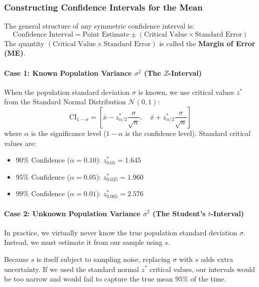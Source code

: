 \subsubsection{Constructing Confidence Intervals for the Mean}
The general structure of any symmetric confidence interval is:
\begin{equation}
\text{Confidence Interval} = \text{Point Estimate} \pm (\text{Critical Value} \times \text{Standard Error})\label{eq:ci_general_structure}
\end{equation}
The quantity $(\text{Critical Value} \times \text{Standard Error})$ is called the \textbf{Margin of Error (ME)}.

\paragraph{Case 1: Known Population Variance $\sigma^2$ (The $Z$-Interval)}
When the population standard deviation $\sigma$ is known, we use critical values $z^*$ from the Standard Normal Distribution $\mathcal{N}(0, 1)$:
\begin{equation}
\text{CI}_{1-\alpha} = \left[ \bar{x} - z_{\alpha/2}^* \frac{\sigma}{\sqrt{n}}, \quad \bar{x} + z_{\alpha/2}^* \frac{\sigma}{\sqrt{n}} \right]\label{eq:z_interval}
\end{equation}
where $\alpha$ is the significance level ($1 - \alpha$ is the confidence level). Standard critical values are:
\begin{itemize}
    \item $90\%$ Confidence ($\alpha = 0.10$): $z_{0.05}^* = 1.645$
    \item $95\%$ Confidence ($\alpha = 0.05$): $z_{0.025}^* = 1.960$
    \item $99\%$ Confidence ($\alpha = 0.01$): $z_{0.005}^* = 2.576$
\end{itemize}

\paragraph{Case 2: Unknown Population Variance $\sigma^2$ (The Student's $t$-Interval)}
In practice, we virtually never know the true population standard deviation $\sigma$. Instead, we must estimate it from our sample using $s$. 

Because $s$ is itself subject to sampling noise, replacing $\sigma$ with $s$ adds extra uncertainty. If we used the standard normal $z^*$ critical values, our intervals would be too narrow and would fail to capture the true mean $95\%$ of the time.

